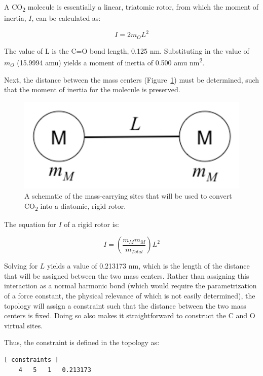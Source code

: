 \documentclass[9pt,tutorial]{livecoms}
\begin{document}
A CO\textsubscript{2} molecule is essentially a linear, triatomic rotor, from which the moment of inertia, $I$, can be calculated as:

\begin{equation} \label{eq_rotor}
I = 2 m_O L^2
\end{equation}

The value of L is the C=O bond length, 0.125 nm. Substituting in the value of $m_O$ (15.9994 amu) yields a moment of inertia of 0.500 amu nm\textsuperscript{2}.

Next, the distance between the mass centers (Figure~\ref{vsites_masses_fig}) must be determined, such that the moment of inertia for the molecule is preserved.

\begin{figure}[H]
\centering
\includegraphics{vsites_masses}
\caption{A schematic of the mass-carrying sites that will be used to convert CO\textsubscript{2} into a diatomic, rigid rotor.}
\label{vsites_masses_fig}
\end{figure}

The equation for $I$ of a rigid rotor is:

\begin{equation} \label{eq_diatomic}
I = \left(\frac{m_M m_M}{m_{Total}}\right) L^2
\end{equation}

Solving for $L$ yields a value of 0.213173 nm, which is the length of the distance that will be assigned between the two mass centers. Rather than assigning this interaction as a normal harmonic bond (which would require the parametrization of a force constant, the physical relevance of which is not easily determined), the topology will assign a constraint such that the distance between the two mass centers is fixed. Doing so also makes it straightforward to construct the C and O virtual sites.

Thus, the constraint is defined in the topology as:

\begin{verbatim}
[ constraints ]
    4   5   1   0.213173
\end{verbatim}
\end{document}

